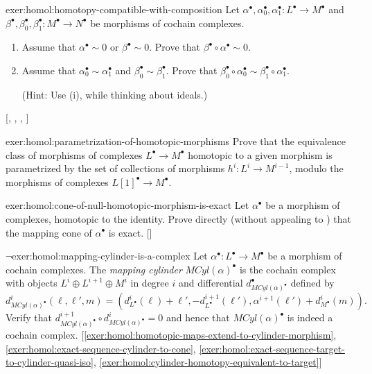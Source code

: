 \begin{exer}{\exerused{}}{exer:homol:homotopy-compatible-with-composition}
  Let
  $\alpha^\bullet, \alpha_0^\bullet, \alpha_1^\bullet : L^\bullet \to
  M^\bullet$ and
  $\beta^\bullet, \beta_0^\bullet, \beta_1^\bullet : M^\bullet \to
  N^\bullet$ be morphisms of cochain complexes.
  \begin{enumerate}[label=(\roman*)]
  \item Assume that $\alpha^\bullet \sim 0$ or $\beta^\bullet \sim 0$.
    Prove that $\beta^\bullet \circ \alpha^\bullet \sim 0$.
  \item Assume that $\alpha_0^\bullet \sim \alpha_1^\bullet$ and
    $\beta_0^\bullet \sim \beta_1^\bullet$. Prove that
    $\beta_0^\bullet \circ \alpha_0^\bullet \sim \beta_1^\bullet \circ
    \alpha_1^\bullet$.

    (Hint: Use (i), while thinking about ideals.)
  \end{enumerate} [,
  ,
  ,
  ]
\end{exer}
\begin{exer}{}{exer:homol:parametrization-of-homotopic-morphisms}
  Prove that the equivalence class of morphisms of complexes
  $L^\bullet \to M^\bullet$ homotopic to a given morphism is
  parametrized by the set of collections of morphisms
  $h^i : L^i \to M^{i-1}$, modulo the morphisms of complexes
  $L[1]^\bullet \to M^\bullet$.
\end{exer}
\begin{exer}{\exerused{}}{exer:homol:cone-of-null-homotopic-morphism-is-exact}
  Let $\alpha^\bullet$ be a morphism of complexes, homotopic to the
  identity. Prove directly (without appealing to )
  that the mapping cone of $\alpha^\bullet$ is
  exact. []
\end{exer}
\begin{exer}{$\lnot$}{exer:homol:mapping-cylinder-is-a-complex}
  Let $\alpha^\bullet : L^\bullet \to M^\bullet$ be a morphism of
  cochain complexes. The \emph{mapping cylinder}
  $MCyl(\alpha)^\bullet$ is the cochain complex with objects
  $L^i \oplus L^{i+1} \oplus M^i$ in degree $i$ and differential
  $d^\bullet_{MCyl(\alpha)^\bullet}$ defined by
  \[
    d^i_{MCyl(\alpha)^\bullet}(\ell, \ell', m) =
    (d^i_{L^\bullet}(\ell) + \ell', -d^{i+1}_{L^\bullet}(\ell'),
    \alpha^{i+1}(\ell') + d^i_{M^\bullet}(m)).
  \]
  Verify that
  $d^{i+1}_{MCyl(\alpha)^\bullet} \circ d^i_{MCyl(\alpha)^\bullet} =
  0$ and hence that $MCyl(\alpha)^\bullet$ is indeed a cochain
  complex. [\ref{exer:homol:homotopic-maps-extend-to-cylinder-morphism},
  \ref{exer:homol:exact-sequence-cylinder-to-cone},
  \ref{exer:homol:exact-sequence-target-to-cylinder-quasi-iso},
  \ref{exer:homol:cylinder-homotopy-equivalent-to-target}]
\end{exer}
